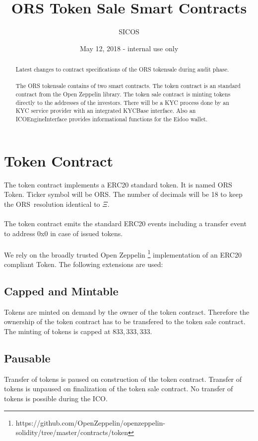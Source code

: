 \documentclass{article}
\title{ORS Token Sale Smart Contracts}
\author{SICOS}
\date{May 12, 2018 - internal use only}
\newcommand{\ether}{$\Xi$}
\newcommand{\ors}{{\sf ORS}}
\newcommand{\orsT}{{\sf ORS Token}}
\begin{document}
\maketitle


 \begin{abstract}
 Latest changes to contract specifications of the ORS tokensale during audit
 phase.\\\\
 The ORS tokensale contains of two smart contracts. The token contract is an standard contract from the Open
 Zeppelin library. The token sale contract is minting tokens directly to the
 addresses of the investors. There will be a KYC process done by an KYC service
 provider with an integrated KYCBase interface. Also an ICOEngineInterface
 provides informational functions for the Eidoo wallet.
 \end{abstract}

\section{Token Contract}
The token contract implements a ERC20 standard token. It is named \orsT.
Ticker symbol will be \ors. The number of decimals will be 18 to keep the
\ors \ resolution  identical to \ether. \\\\
The token contract emits the standard ERC20 events including a transfer event to
address 0x0 in case of issued tokens.\\\\
We rely on the broadly trusted Open
Zeppelin \footnote{https://github.com/OpenZeppelin/openzeppelin-solidity/tree/master/contracts/token}
implementation of an ERC20 compliant Token. The following extensions are used:

\subsection{Capped and Mintable}
Tokens are minted on demand by the owner of the token contract. Therefore the
ownership of the token contract has to be transfered to the token sale contract. The minting of tokens is capped at
$833,333,333$.

\subsection{Pausable}
Transfer of tokens is paused on construction of the token contract. Transfer of
tokens is unpaused on finalization of the token sale contract. No transfer of
tokens is possible during the ICO.
\end{document}
